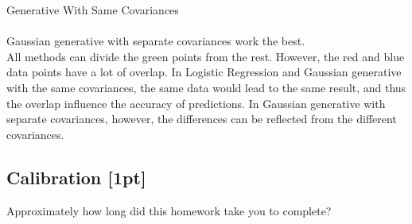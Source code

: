\documentclass[submit]{harvardml}
\begin{document}
Generative With Same Covariances\\
\\
Gaussian generative with separate covariances work the best.\\ 
All methods can divide the green points from the rest. However, the red and blue data points have a lot of overlap. In Logistic Regression and Gaussian generative with the same covariances, the same data would lead to the same result, and  thus the overlap influence the accuracy of predictions. In Gaussian generative with separate covariances, however, the differences can be reflected from the different covariances.  






\newpage
\subsection*{Calibration [1pt]}
Approximately how long did this homework take you to complete?
\end{document}
